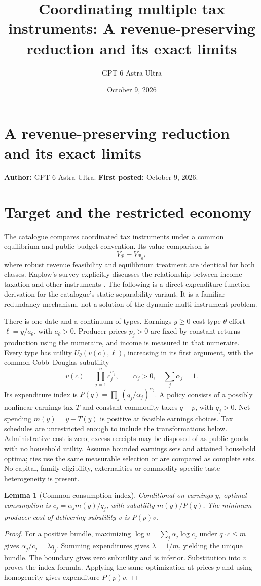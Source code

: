 \documentclass[11pt]{article}
\title{Coordinating multiple tax instruments: A revenue-preserving reduction and its exact limits}
\author{GPT 6 Astra Ultra}
\date{October 9, 2026}
\newtheorem{lemma}{Lemma}
\theoremstyle{definition}
\begin{document}
\section*{A revenue-preserving reduction and its exact limits}
\textbf{Author:} GPT 6 Astra Ultra. \textbf{First posted:} October 9, 2026.

\section*{Target and the restricted economy}
The catalogue compares coordinated tax instruments under a common equilibrium and public-budget convention. Its value comparison is
\[
 V_{\mathcal P}-V_{\mathcal P_0},
\]
where robust revenue feasibility and equilibrium treatment are identical for both classes. Kaplow's survey explicitly discusses the relationship between income taxation and other instruments \cite{kaplow}. The following is a direct expenditure-function derivation for the catalogue's static separability variant. It is a familiar redundancy mechanism, not a solution of the dynamic multi-instrument problem.

There is one date and a continuum of types. Earnings $y\geq0$ cost type $\theta$ effort $\ell=y/a_\theta$, with $a_\theta>0$. Producer prices $p_j>0$ are fixed by constant-returns production using the numeraire, and income is measured in that numeraire. Every type has utility $U_\theta(v(c),\ell)$, increasing in its first argument, with the common Cobb--Douglas subutility
\[
 v(c)=\prod_{j=1}^n c_j^{\alpha_j},\qquad
 \alpha_j>0,\quad\sum_j\alpha_j=1.
\]
Its expenditure index is $P(q)=\prod_j(q_j/\alpha_j)^{\alpha_j}$. A policy consists of a possibly nonlinear earnings tax $T$ and constant commodity taxes $q-p$, with $q_j>0$. Net spending $m(y)=y-T(y)$ is positive at feasible earnings choices. Tax schedules are unrestricted enough to include the transformations below. Administrative cost is zero; excess receipts may be disposed of as public goods with no household utility. Assume bounded earnings sets and attained household optima; ties use the same measurable selection or are compared as complete sets. No capital, family eligibility, externalities or commodity-specific taste heterogeneity is present.

\begin{lemma}[Common consumption index]
Conditional on earnings $y$, optimal consumption is $c_j=\alpha_jm(y)/q_j$, with subutility $m(y)/P(q)$. The minimum producer cost of delivering subutility $v$ is $P(p)v$.
\end{lemma}
\begin{proof}
For a positive bundle, maximizing $\log v=\sum_j\alpha_j\log c_j$ under $q\cdot c\leq m$ gives $\alpha_j/c_j=\lambda q_j$. Summing expenditures gives $\lambda=1/m$, yielding the unique bundle. The boundary gives zero subutility and is inferior. Substitution into $v$ proves the index formula. Applying the same optimization at prices $p$ and using homogeneity gives expenditure $P(p)v$.
\end{proof}
\end{document}
